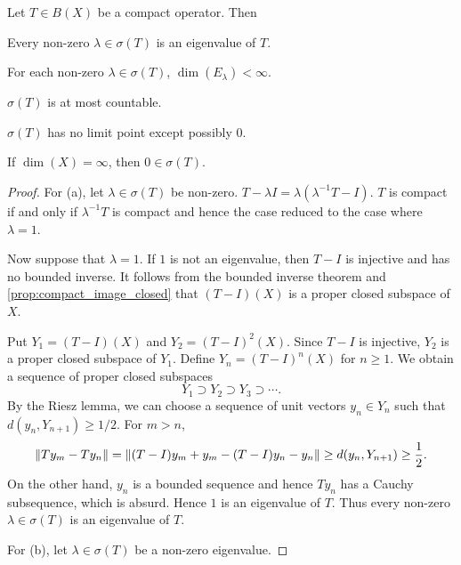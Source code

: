 \begin{theorem}
    Let $T\in B(X)$ be a compact operator. Then 
    \begin{thmenum}
        \item Every non-zero $\lambda\in\sigma(T)$ is an eigenvalue 
        of $T$. 
        \item For each non-zero $\lambda\in\sigma(T)$, $\dim(E_\lambda)<\infty$. 
        \item $\sigma(T)$ is at most countable. 
        \item $\sigma(T)$ has no limit point except possibly $0$. 
        \item If $\dim(X) = \infty$, then $0\in\sigma(T)$.
    \end{thmenum}
\end{theorem}
\begin{proof}
    For (a), let $\lambda\in\sigma(T)$ be non-zero. $T-\lambda I = \lambda(\lambda^{-1}T - I)$. 
    $T$ is compact if and only if $\lambda^{-1}T$ is compact and 
    hence the case reduced to the case where $\lambda = 1$. 

    Now suppose that $\lambda = 1$. If $1$ is not an eigenvalue, then 
    $T-I$ is injective and has no bounded inverse. It follows from the 
    bounded inverse theorem and \cref{prop:compact_image_closed} that 
    $(T-I)(X)$ is a proper closed subspace of $X$. 

    Put $Y_1 = (T-I)(X)$ and $Y_2 = (T-I)^2(X)$. Since $T-I$ is injective, 
    $Y_2$ is a proper closed subspace of $Y_1$. Define $Y_n = (T-I)^n(X)$ for $n\geq 1$. 
    We obtain a sequence of proper closed subspaces 
    \begin{equation*}
        Y_1\supset Y_2\supset Y_3\supset \cdots.
    \end{equation*}
    By the Riesz lemma, we can choose a sequence of unit vectors 
    $y_n\in Y_n$ such that $d(y_n, Y_{n+1})\geq 1/2$. For $m>n$, 
    \begin{equation*}
        \left\lVert {Ty_m - Ty_n} \right\rVert = \left\lVert {(T-I)y_m + y_m - (T-I)y_n - y_n} \right\rVert 
        \geq d(y_n, Y_{n+1}) \geq \frac{1}{2}.
    \end{equation*}
    On the other hand, $y_n$ is a bounded sequence and hence $Ty_n$ has 
    a Cauchy subsequence, which is absurd. Hence $1$ is an eigenvalue 
    of $T$. Thus every non-zero $\lambda\in\sigma(T)$ is an eigenvalue of $T$. 

    For (b), let $\lambda\in\sigma(T)$ be a non-zero eigenvalue. 
\end{proof}